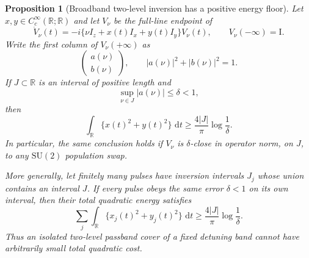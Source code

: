 \documentclass[11pt]{article}
\newtheorem{proposition}[theorem]{Proposition}
\theoremstyle{remark}
\newcommand{\Id}{\mathrm I}
\newcommand{\dd}{\,\mathrm d}
\begin{document}
\begin{proposition}[Broadband two-level inversion has a positive energy floor]
\label{prop:zs-broadband-energy-floor}
Let $x,y\in C_c^\infty(\mathbb R;\mathbb R)$ and let $V_\nu$ be the
full-line endpoint of
\begin{equation}
 \dot V_\nu(t)
 =
 -i\{\nu I_z+x(t)I_x+y(t)I_y\}V_\nu(t),
 \qquad
 V_\nu(-\infty)=\Id .
 \label{eq:full-line-bloch-pulse}
\end{equation}
Write the first column of $V_\nu(+\infty)$ as
\[
 \begin{pmatrix}a(\nu)\\ b(\nu)\end{pmatrix},
 \qquad |a(\nu)|^2+|b(\nu)|^2=1.
\]
If $J\subset\mathbb R$ is an interval of positive length and
\begin{equation}
 \sup_{\nu\in J}|a(\nu)|\leq\delta<1,
 \label{eq:uniform-inversion-transmission-bound}
\end{equation}
then
\begin{equation}
 \int_{\mathbb R}\{x(t)^2+y(t)^2\}\,\dd t
 \geq
 \frac{4|J|}{\pi}\log\frac1\delta .
 \label{eq:zs-inversion-energy-lower-bound}
\end{equation}
In particular, the same conclusion holds if $V_\nu$ is
$\delta$-close in operator norm, on $J$, to any $\mathrm{SU}(2)$ population
swap.

More generally, let finitely many pulses have inversion intervals $J_j$ whose
union contains an interval $J$.  If every pulse obeys the same error
$\delta<1$ on its own interval, then their total quadratic energy satisfies
\begin{equation}
 \sum_j\int_{\mathbb R}\{x_j(t)^2+y_j(t)^2\}\,\dd t
 \geq
 \frac{4|J|}{\pi}\log\frac1\delta .
 \label{eq:zs-cover-energy-lower-bound}
\end{equation}
Thus an isolated two-level passband cover of a fixed detuning band cannot
have arbitrarily small total quadratic cost.
\end{proposition}
\end{document}

